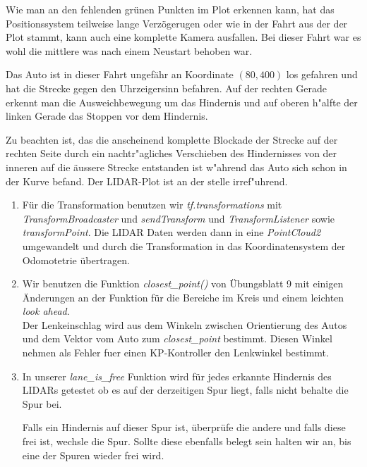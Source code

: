 \documentclass[10pt,oneside,a4paper]{article}
\begin{document}
    Wie man an den fehlenden gr\"unen Punkten im Plot erkennen kann, hat das Positionssystem
    teilweise lange Verz\"ogerugen oder wie in der Fahrt aus der der Plot stammt, kann auch eine
    komplette Kamera ausfallen. Bei dieser Fahrt war es wohl die mittlere was nach einem Neustart
    behoben war.

    Das Auto ist in dieser Fahrt ungef\"ahr an Koordinate $(80, 400)$ los gefahren und hat die
    Strecke gegen den Uhrzeigersinn befahren. Auf der rechten Gerade erkennt man die
    Ausweichbewegung um das Hindernis und auf oberen h"alfte der linken Gerade das Stoppen vor dem
    Hindernis.

    Zu beachten ist, das die anscheinend komplette Blockade der Strecke auf der rechten Seite durch
    ein nachtr"agliches Verschieben des Hindernisses von der inneren auf die \"aussere Strecke
    entstanden ist w"ahrend das Auto sich schon in der Kurve befand. Der LIDAR-Plot ist an der
    stelle irref"uhrend.
	\begin{enumerate}
    \item Für die Transformation benutzen wir \emph{tf.transformations} mit
      \emph{TransformBroadcaster} und \emph{sendTransform} und \emph{TransformListener} sowie
      \emph{transformPoint}. Die LIDAR Daten werden dann in eine \emph{PointCloud2} umgewandelt und
      durch die Transformation in das Koordinatensystem der Odomotetrie \"ubertragen.
    \item Wir benutzen die Funktion \emph{closest\_point()} von Übungsblatt 9 mit einigen Änderungen
      an der Funktion für die Bereiche im Kreis und einem leichten \emph{look ahead}.\\
      Der Lenkeinschlag wird aus dem Winkeln zwischen Orientierung des Autos und dem Vektor vom Auto
      zum \emph{closest\_point} bestimmt. Diesen Winkel nehmen als Fehler fuer einen KP-Kontroller
      den Lenkwinkel bestimmt.
    \item In unserer \emph{lane\_is\_free} Funktion wird f\"ur jedes erkannte Hindernis
      des LIDARs getestet ob es auf der derzeitigen Spur liegt, falls nicht behalte die Spur bei.

      Falls ein Hindernis auf dieser Spur ist, \"uberpr\"ufe die andere und falls diese frei ist,
      wechsle die Spur. Sollte diese ebenfalls belegt sein halten wir an, bis eine der Spuren wieder
      frei wird.
	\end{enumerate}
\end{document}

